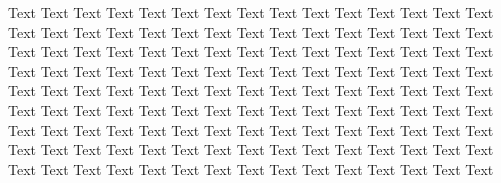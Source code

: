 Text Text Text Text Text Text Text Text Text Text Text Text Text Text Text 
Text Text Text Text Text Text Text Text Text Text Text Text Text Text Text 
Text Text Text Text Text Text Text Text Text Text Text Text Text Text Text 
Text Text Text Text Text Text Text Text Text Text Text Text Text Text Text 
Text Text Text Text Text Text Text Text Text Text Text Text Text Text Text 
Text Text Text Text Text Text Text Text Text Text Text Text Text Text Text 
Text Text Text Text Text Text Text Text Text Text Text Text Text Text Text 
Text Text Text Text Text Text Text Text Text Text Text Text Text Text Text 
Text Text Text Text Text Text Text Text Text Text Text Text Text Text Text 
